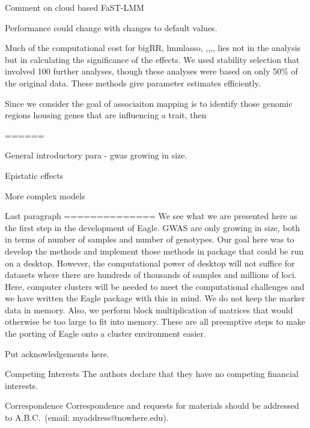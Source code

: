 \documentclass{nature}
\begin{document}
Comment on cloud based FaST-LMM

Performance could change with changes to default values. 

Much of the computational cost for bigRR, lmmlasso, ,,,, lies not in the analysis but in calculating the significance of the effects. We used 
stability selection that involved 100 further analyses, though these analyses were based on only 50\% of the original data. 
These methods give parameter estimates efficiently.  

Since we consider the goal of associaiton mapping is to identify those genomic regions housing genes that are influencing a trait, then 

======

General introductory para - gwas growing in size. 

Epistatic effects

More complex models

Last paragraph
==============
We see what we are presented here as the first step in the development of Eagle. GWAS are only growing in size, both in terms of number of 
samples and number of genotypes. Our goal here was to develop the methods and implement those methods in package that could be run on a desktop. 
However, the computational power of desktop will not suffice for datasets where there are hundreds of thousands of samples and millions of loci. 
Here, computer clusters will be needed to meet the computational challenges and we have written the Eagle package with this in mind. We do not 
keep the marker data in memory. Also, we perform block multiplication of matrices that would otherwise be too large to fit into memory. These are all 
preemptive steps to make the porting of Eagle onto a cluster environment easier. 






















\begin{addendum}
 \item Put acknowledgements here.
 \item[Competing Interests] The authors declare that they have no
competing financial interests.
 \item[Correspondence] Correspondence and requests for materials
should be addressed to A.B.C.~(email: myaddress@nowhere.edu).
\end{addendum}
\end{document}
